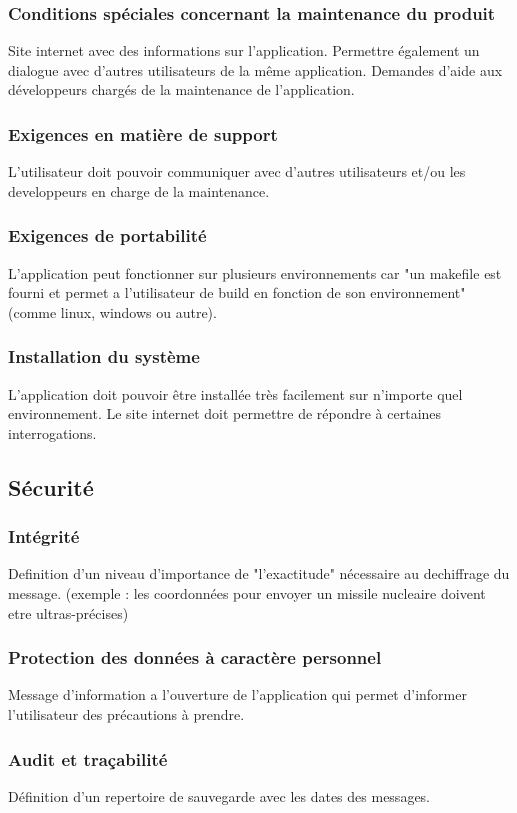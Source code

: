 \documentclass[a4]{article}
\begin{document}
			\subsubsection {Conditions spéciales concernant la maintenance du produit}
				Site internet avec des informations sur l'application.
				Permettre également un dialogue avec d'autres utilisateurs de la même application.
				Demandes d'aide aux développeurs chargés de la maintenance de l'application.
			\subsubsection {Exigences en matière de support}
				L'utilisateur doit pouvoir communiquer avec d'autres utilisateurs et/ou les developpeurs en 					charge de la maintenance.
			\subsubsection {Exigences de portabilité}
				L'application peut fonctionner sur plusieurs environnements car "un makefile est fourni et 				permet a l'utilisateur de build en fonction de son environnement"(comme linux, windows ou autre).
			\subsubsection {Installation du système}
				L'application doit pouvoir être installée très facilement sur n'importe quel environnement.
				Le site internet doit permettre de répondre à certaines interrogations.
		\subsection{Sécurité}
			\subsubsection {Intégrité}
				Definition d'un niveau d'importance de "l'exactitude" nécessaire au dechiffrage du message.
				(exemple : les coordonnées pour envoyer un missile nucleaire doivent etre ultras-précises)
			\subsubsection {Protection des données à caractère personnel}
				Message d'information a l'ouverture de l'application qui permet d'informer l'utilisateur des 					précautions à prendre.
			\subsubsection {Audit et traçabilité}
				Définition d'un repertoire de sauvegarde avec les dates des messages.
\end{document}
